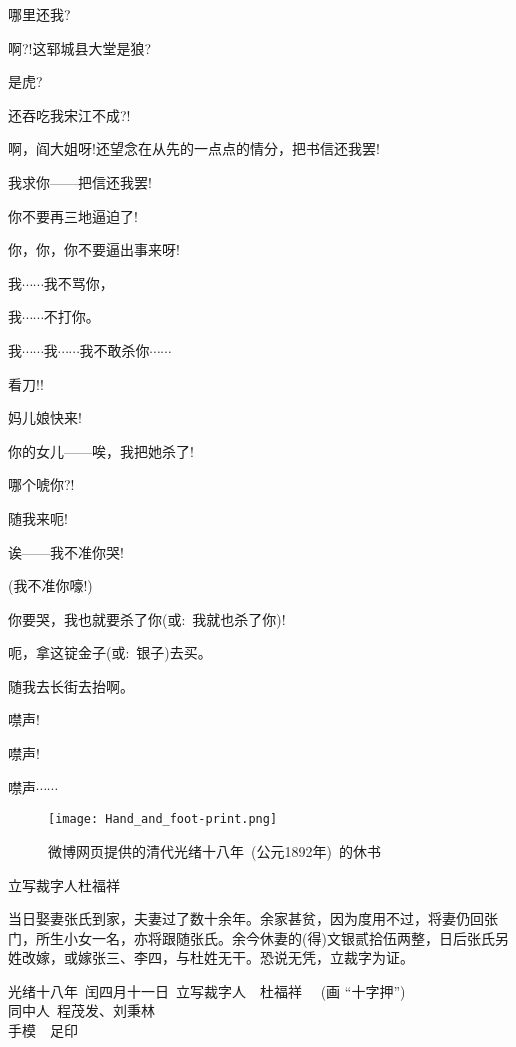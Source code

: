 {{哪里还我?}

{啊?!这郓城县大堂是狼?}

{是虎?}

{还吞吃我宋江不成?!}

{啊，阎大姐呀!还望念在从先的一点点的情分，把书信还我罢!}

{我求你------把信还我罢!}

{你不要再三地逼迫了!}

{你，你，你不要逼出事来呀!}

{我$\cdots{}\cdots{}$我不骂你，}

{我$\cdots{}\cdots{}$不打你。}

{我$\cdots{}\cdots{}$我$\cdots{}\cdots{}$我不敢杀你$\cdots{}\cdots{}$}

{看刀!!}

{妈儿娘快来!}

{你的女儿------唉，我把她杀了!}

{哪个唬你?!}

{随我来呃!}

{诶------我不准你哭!}

{(我不准你嚎!)}

{你要哭，我也就要杀了你({\akai 或}:~我就也杀了你)!}

{呃，拿这锭金子({\akai 或}:~银子)去买。}

{随我去长街去抬啊。}

{噤声!}

{噤声!}

{噤声$\cdots{}\cdots{}$}

}
\vskip 15pt 
{}

\begin{figure}[h!]
\centering
\texttt{[image: Hand\_and\_foot-print.png]}
\caption*{\hei 微博网页提供的清代光绪十八年~(公元1892年)~的休书} 
\label{Collect_Liu_Wu} 
\end{figure}

\vskip 5pt

立写裁字人杜福祥

当日娶妻张氏到家，夫妻过了数十余年。{\footnotesize 余}家甚贫，因为度用不过，将妻仍回张门，所生小女一名，亦将跟随张氏。{\footnotesize 余}今休妻的(得)文银贰拾伍两整，日后张氏另姓改嫁，或嫁张三、李四，与杜姓无干。恐说无凭，立裁字为证。

\begin{flushright}
光绪十八年~闰四月十一日~立写裁字人~~杜福祥 ~~(画 ``十字押'') ~~~\\
\large{同中人~程茂发、刘秉林} ~~~~~~~~~~ \\
\huge{手模}~~\huge{足印} ~~~~~~~
\end{flushright}
